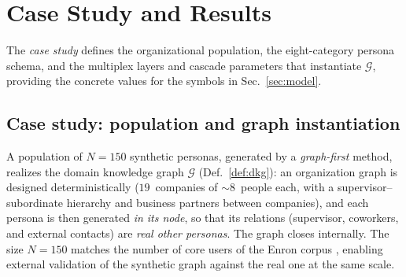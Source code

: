 \section{Case Study and Results}
\label{sec:results}

The \emph{case study} defines the organizational population, the eight-category persona schema, and the multiplex layers and cascade parameters
that instantiate $\mathcal{G}$, providing the concrete values for the symbols in Sec.~\ref{sec:model}.

\subsection{Case study: population and graph instantiation}
\label{sec:cs-setup}
A population of $N{=}150$ synthetic personas, generated by a \emph{graph-first} method, realizes the domain knowledge graph $\mathcal{G}$ (Def.~\ref{def:dkg}): an organization graph is designed deterministically
($19$~companies of $\sim\!8$~people each, with a supervisor--subordinate hierarchy and business partners between
companies), and each persona is then generated \emph{in its node}, so that its relations (supervisor, coworkers, and external contacts) are \emph{real other personas}. The graph closes internally. The size $N{=}150$ matches the
number of core users of the Enron corpus \citep{klimt2004enron}, enabling external validation of the synthetic
graph against the real one at the same scale.

